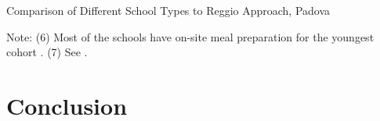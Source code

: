 \begin{table}[H]
\centering
\scriptsize
\begin{threeparttable}
\caption{Comparison of Different School Types to Reggio Approach, Padova}\label{tab:comparisonPad}
	
\begin{tablenotes}
\item Note: (6) Most of the schools have on-site meal preparation for the youngest cohort \citep{
Padova_Parma-Commune_2016}. (7) See \citet{Padova_Parma-Commune_2016}.
\end{tablenotes}
\end{threeparttable}
\end{table}

\section{Conclusion}
\label{sec:conclusion}





